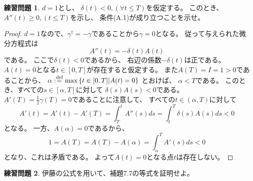 \documentclass[uplatex]{jsarticle}
\theoremstyle{definition}
\newtheorem{prob}[prob]{練習問題}
\def\dfn{:\overset{\mbox{{\scriptsize def}}}{=}}
\begin{document}
\begin{prob}\label{prob: 7.3}
  \(d=1\)とし、
  \(\delta(t) < 0 , (\forall t \leq T)\)を仮定する。
  このとき、
  \(A''(t) \geq 0 , (t \leq T)\)を示し、
  条件(A.1)が成り立つことを示せ。
\end{prob}

\begin{proof}
  \(d=1\)なので、\(\gamma^\dagger = -\gamma\)であることから\(\gamma = 0\)となる。
  従って与えられた微分方程式は
  \[
  A''(t) = -\delta(t) A(t)
  \]
  である。
  ここで\(\delta(t) < 0\)であるから、
  右辺の係数\(-\delta(t)\)は正である。
  \(A(t) = 0\)となる\(t\in [0,T]\)が存在すると仮定する。
  また\(A(T) = I = 1 > 0\)であることから、
  \(\alpha \dfn \max\left\{ t\in [0,T] \middle| A(t) = 0\right\}\)
  とおけば、
  \(\alpha < T\)である。
  このとき、すべての\(s\in [\alpha,T]\)に対して
  \(\delta(s)A(s) < 0\)である。
  \(A'(T) = \frac{1}{2}\gamma(T) = 0\)であることに注意して、
  すべての\(t\in (\alpha,T)\)に対して
  \[
  A'(t) = A'(t) - A'(T)
  = \int_T^t A''(s)ds = \int_t^T \delta(s)A(s) ds < 0
  \]
  となる。
  一方、\(A(\alpha)=0\)であるから、
  \[
  1 = A(T) = A(T) - A(\alpha) = \int_\alpha^T A'(s)ds < 0
  \]
  となり、これは矛盾である。
  よって\(A(t) = 0\)となる点\(t\)は存在しない。
\end{proof}








\begin{prob}\label{prob: 7.4}
  伊藤の公式を用いて、補題7.7の等式を証明せよ。
\end{prob}
\end{document}
